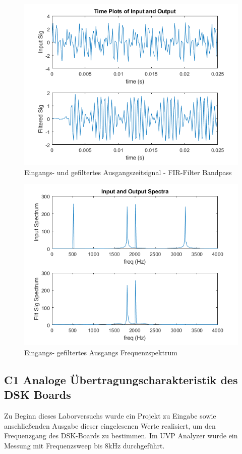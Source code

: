 \begin{figure}[h]
\centering
\includegraphics[width=0.7\linewidth]{./Bilder/Attachment_B_fir_3_Timeplot}
\caption{Eingangs- und gefiltertes Ausgangszeitsignal  - FIR-Filter Bandpass}
\label{fig:Attachment_B_fir_3_Timeplot}
\end{figure}

\clearpage

\begin{figure}[h]
\centering
\includegraphics[width=0.7\linewidth]{./Bilder/Attachment_B_fir_3_Spektrum}
\caption{Eingangs- gefiltertes Ausgangs Frequenzspektrum}
\label{fig:Attachment_B_fir_3_Spektrum}
\end{figure}

\clearpage

\subsection{C1 Analoge Übertragungscharakteristik des DSK Boards}
\noindent Zu Beginn dieses Laborversuchs wurde ein Projekt zu Eingabe sowie anschließenden Ausgabe dieser eingelesenen Werte realisiert, um den Frequenzgang des DSK-Boards zu bestimmen. Im UVP Analyzer wurde ein Messung mit Frequenzsweep bis 8kHz durchgeführt.

